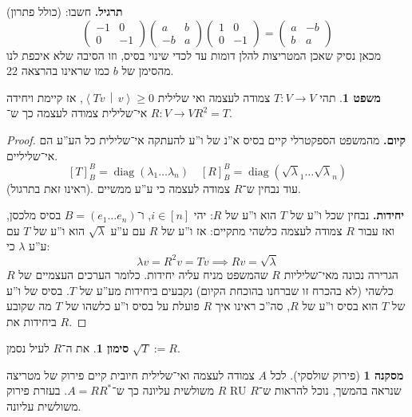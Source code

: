 \documentclass[a4paper]{article}
\newcommand\ra    {\rangle}
\newcommand\la    {\langle}
\DeclareMathOperator{\diag}    {diag}
\newcommand\co        {\colon}
\newcommand\pms[1]    {\begin{pmatrix}
		#1
\end{pmatrix}}
\newcommand\mut [2]   {\left \la #1 \,\middle\vert\, #2 \right \ra}
\renewcommand\lg      {\lambda}
\theoremstyle{definition}
\newtheorem{Theorem}{משפט}
\newtheorem{Notion}{סימון}
\newtheorem{Collary}{מסקנה}
\newcommand\theo  [1] {\begin{Theorem}#1\end{Theorem}}
\newcommand\noti  [1] {\begin{Notion}#1\end{Notion}}
\begin{document}
	
	
	
	
	\textbf{תרגיל. }חשבו: (כולל פתרון)
	\[ \pms{-1 & 0 \\ 0 & -1}\pms{a & b \\ -b & a}\pms{1 & 0 \\ 0 & -1} = \pms{a & -b \\ b & a} \]
	מכאן נסיק שאכן המטריצות להלן דומות עד לכדי שינוי בסיס, וזו הסיבה שלא איכפת לנו מהסימן של $b$ כמו שראינו בהרצאה 22. 
	
	\theo{תהי $T \co V \to V$ צמודה לעצמה ואי שלילית $\mut{Tv}{v} \ge 0$, אז קיימת ויחידה $R \co V \to V$ אי־שלילית צמודה לעצמה כך ש־$R^2 = T$. }
	
	\begin{proof}
		\textbf{קיום. }
		מהמשפט הספקטרלי קיים בסיס א''נ של ו''ע להעתקה אי־שלילית כל הע''ע הם אי־שליליים. 
		\[ [T]^{B}_B = \diag(\lg_1 \dots \lg_n) \quad [R]_B^B = \diag(\sqrt \lg_1 \dots \sqrt \lg_n) \]
		(ראינו זאת בתרגול). עוד נבחין ש־$R$ צמודה לעצמה כי ע''ע ממשיים. 
		
		\textbf{יחידות. }נבחין שכל ו''ע של $T$ הוא ו''ע של $R$: יהי $i \in [n]$, ו־$B = (e_1 \dots e_n)$ בסיס מלכסן, ואז עבור $R$ צמודה לעצמה כלשהי מתקיים: אז ו''ע של $R$ עם ע''ע $\sqrt \lg$ הוא ו''ע של $T$ עם ע''ע $\lg$ כי: 
		\[ \lg v = R^2v = Tv \implies Rv = \sqrt \lg \]
		הגרירה נכונה מאי־שליליות $R$ שהמשפט מניח עליה יחידות. כלומר הערכים העצמיים של $R$ כלשהי (לא בהכרח זו שברחנו בהוכחת הקיום) נקבעים ביחידות מע''ע של $T$. בסיס של ו''ע של $T$ הוא בסיס ו''ע של $R$, סה''כ ראינו איך $R$ פועלת על בסיס ו''ע כלשהו של $T$ מה שקובע ביחידות את $R$. 
	\end{proof}
	
	\noti{את ה־$R$ לעיל נסמן $\sqrt{T} := R$. }
	
	\begin{Collary}[פירוק שולסקי]
		לכל $A$ צמודה לעצמה ואי־שלילית חיובית קיים פירוק של מטריצה $R$ משולשית עליונה כך ש־$A=RR^*$. בעזרת פירוק RU שנראה בהמשך, נוכל להראות ש־$R$ משולשית עליונה. 
	\end{Collary}
	
\end{document}
